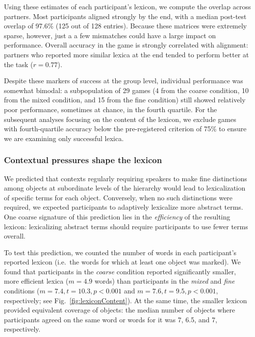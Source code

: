 \documentclass[10pt,letterpaper]{article}
\begin{document}
Using these estimates of each participant's lexicon, we compute the overlap across partners. Most participants aligned strongly by the end, with a median post-test overlap of 97.6\% (125 out of 128 entries). Because these matrices were extremely sparse, however, just a a few mismatches could have a large impact on performance. Overall accuracy in the game is strongly correlated with alignment: partners who reported more similar lexica at the end tended to perform better at the task ($r = 0.77$).  

Despite these markers of success at the group level, individual performance was somewhat bimodal: a subpopulation of 29 games (4 from the coarse condition, 10 from the mixed condition, and 15 from the fine condition) still showed relatively poor performance, sometimes at chance, in the fourth quartile. For the subsequent analyses focusing on the content of the lexicon, we exclude games with fourth-quartile accuracy below the pre-registered criterion of 75\% to ensure we are examining only successful lexica. %

\subsubsection{Contextual pressures shape the lexicon}

We predicted that contexts regularly requiring speakers to make fine distinctions among objects at subordinate levels of the hierarchy would lead to lexicalization of specific terms for each object. Conversely, when no such distinctions were required, we expected participants to adaptively lexicalize more abstract terms. One coarse signature of this prediction lies in the \emph{efficiency} of the resulting lexicon: lexicalizing abstract terms should require participants to use fewer terms overall.

To test this prediction, we counted the number of words in each participant's reported lexicon (i.e.\ the words for which at least one object was marked). We found that participants in the \emph{coarse} condition reported significantly smaller, more efficient lexica ($m = 4.9$ words) than participants in the \emph{mixed} and \emph{fine} conditions ($m = 7.4, t = 10.3, p <0.001$ and $m = 7.6, t = 9.5, p < 0.001$, respectively; see Fig.\ \ref{fig:lexiconContent}). At the same time, the smaller lexicon provided equivalent coverage of objects: the median number of objects where participants agreed on the same word or words for it was 7, 6.5, and 7, respectively. 
\end{document}
